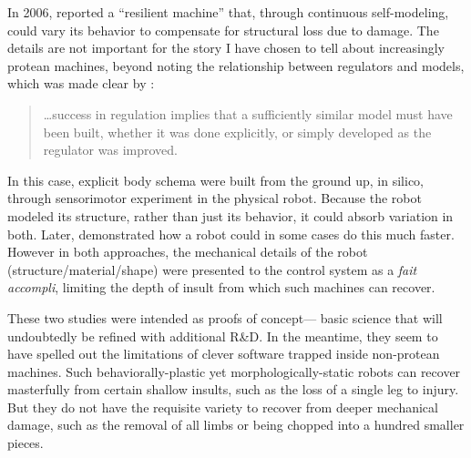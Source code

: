 In 2006,
\citet{bongard2006resilient} reported a ``resilient machine'' that, through continuous self-modeling,
could vary its behavior to compensate for structural loss due to damage.
The details are not 
important for the story I have chosen to tell about increasingly protean machines,
beyond noting the relationship between regulators and models, which was made clear by \citet{conant1970every}:
\begin{quote}
\small
\dots success in regulation implies that a sufficiently similar model must have been built, whether it was done explicitly, or simply developed as the regulator was improved.
\end{quote}
In this case, explicit body schema were built from the ground up, in silico, through sensorimotor experiment in the physical robot.
Because the robot modeled its structure, rather than just its behavior, it could absorb variation in both.
Later, \citet{cully2015robots} demonstrated how a robot could in some cases do this much faster.
However in both approaches, the mechanical details of the robot (structure/material/shape) were presented to the control system as a \textit{fait accompli},
limiting the depth of insult 
from which such machines can recover.


These two studies were intended as proofs of concept---%
basic science
that will undoubtedly be refined with additional R\&D.
In the meantime, they seem to have spelled out the limitations of clever software trapped inside non-protean machines.
Such
behaviorally-plastic yet morphologically-static robots can recover masterfully from certain shallow insults, such as the
loss of a single leg to injury.
But they do not have the requisite variety to recover from deeper mechanical damage, such as the removal of all limbs or being chopped into a hundred smaller pieces.

